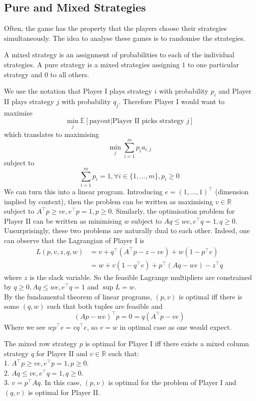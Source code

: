 \subsection{Pure and Mixed Strategies}
Often, the game has the property that the players choose their strategies simultaneously.
The idea to analyse these games is to randomise the strategies.
\begin{definition}
    A mixed strategy is an assignment of probabilities to each of the individual strategies.
    A pure strategy is a mixed strategies assigning $1$ to one particular strategy and $0$ to all others.
\end{definition}
We use the notation that Player I plays strategy $i$ with probability $p_i$ and Player II plays strategy $j$ with probability $q_j$.
Therefore Player I would want to maximise
$$\min_j\mathbb E[\text{payout}|\text{Player II picks strategy $j$}]$$
which translates to maximising
$$\min_j\sum_{i=1}^mp_ia_{i,j}$$
subject to 
$$\sum_{i=1}^mp_i=1,\forall i\in\{1,\ldots,m\},p_i\ge 0$$
We can turn this into a linear program.
Introducing $e=(1,\ldots,1)^\top$ (dimension implied by context), then the problem can be written as maximising $v\in\mathbb R$ subject to $A^\top p\ge ve,e^\top p=1,p\ge 0$.
Similarly, the optimisation problem for Player II can be written as minimising $w$ subject to $Aq\le we, e^\top q=1,q\ge 0$.\\
Unsurprisingly, these two problems are naturally dual to each other.
Indeed, one can observe that the Lagrangian of Player I is
\begin{align*}
    L(p,v,z,q,w)&=v+q^\top(A^\top p-z-ve)+w(1-p^\top e)\\
    &=w+v(1-q^\top e)+p^\top(Aq-we)-z^\top q
\end{align*}
where $z$ is the slack variable.
So the feasible Lagrange multipliers are constrained by $q\ge 0,Aq\le we,e^\top q=1$ and $\sup L=w$.\\
By the fundamental theorem of linear programs, $(p,v)$ is optimal iff there is some $(q,w)$ such that both tuples are feasible and
$$(Ap-we)^\top p=0=q(A^\top p-ve)$$
Where we see $wp^\top e=vq^\top e$, so $v=w$ in optimal case as one would expect.
\begin{theorem}
    The mixed row strategy $p$ is optimal for Player I iff there exists a mixed column strategy $q$ for Player II and $v\in\mathbb R$ such that:\\
    1. $A^\top p\ge ve,e^\top p=1,p\ge 0$.\\
    2. $Aq\le ve,e^\top q=1,q\ge 0$.\\
    3. $v=p^\top Aq$.
    In this case, $(p,v)$ is optimal for the problem of Player I and $(q,v)$ is optimal for Player II.
\end{theorem}
